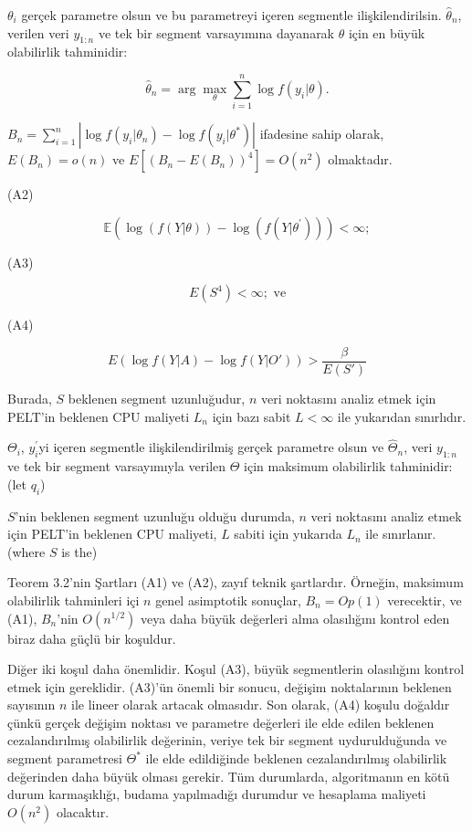 \documentclass[12pt,twoside]{deuthesis}
\begin{document}
\(\theta_i\) gerçek parametre olsun ve bu parametreyi içeren segmentle ilişkilendirilsin. \(\hat{\theta}_n\), verilen veri \(y_{1:n}\) ve tek bir segment varsayımına dayanarak \(\theta\) için en büyük olabilirlik tahminidir:

\[ \hat{\theta}_n = \arg\max_{\theta} \sum_{i=1}^n \log f(y_i|\theta). \]

\(B_n = \sum_{i=1}^n \left| \log f(y_i|\theta_n) - \log f(y_i|\theta^*) \right|\) ifadesine sahip olarak, \(E(B_n) = o(n)\) ve \(E[(B_n - E(B_n))^4] = O(n^2)\) olmaktadır.

(A2)

\[ \mathbb{E} \left( \log(f(Y|\theta)) - \log(f(Y|\theta^{'})) \right) < \infty; \]

(A3)

\[ E(S^4) < \infty; \text{ ve} \]

(A4)

\[ E\left(\log f(Y|A) - \log f(Y|O')\right) > \frac{\beta}{E(S')} \]

Burada, \(S\) beklenen segment uzunluğudur, \(n\) veri noktasını analiz etmek için PELT'in beklenen CPU maliyeti \(L_n\) için bazı sabit \(L < \infty\) ile yukarıdan sınırlıdır.

\(\Theta_i\), \(y_i^{'}\)yi içeren segmentle ilişkilendirilmiş gerçek parametre olsun ve \(\hat{\Theta}_n\), veri \(y_{1:n}\) ve tek bir segment varsayımıyla verilen \(\Theta\) için maksimum olabilirlik tahminidir: (let \(q_i\))

\(S\)'nin beklenen segment uzunluğu olduğu durumda, \(n\) veri noktasını analiz etmek için PELT'in beklenen CPU maliyeti, \(L\) sabiti için yukarıda \(L_n\) ile sınırlanır. (where \(S\) is the)

Teorem 3.2'nin Şartları (A1) ve (A2), zayıf teknik şartlardır. Örneğin, maksimum olabilirlik tahminleri içi \(n\) genel asimptotik sonuçlar, \(B_n = Op(1)\) verecektir, ve (A1), \(B_n\)'nin \(O(n^{1/2})\) veya daha büyük değerleri alma olasılığını kontrol eden biraz daha güçlü bir koşuldur.

Diğer iki koşul daha önemlidir. Koşul (A3), büyük segmentlerin olasılığını kontrol etmek için gereklidir. (A3)'ün önemli bir sonucu, değişim noktalarının beklenen sayısının \(n\) ile lineer olarak artacak olmasıdır. Son olarak, (A4) koşulu doğaldır çünkü gerçek değişim noktası ve parametre değerleri ile elde edilen beklenen cezalandırılmış olabilirlik değerinin, veriye tek bir segment uydurulduğunda ve segment parametresi \(\Theta^*\) ile elde edildiğinde beklenen cezalandırılmış olabilirlik değerinden daha büyük olması gerekir. Tüm durumlarda, algoritmanın en kötü durum karmaşıklığı, budama yapılmadığı durumdur ve hesaplama maliyeti \(O(n^2)\) olacaktır.
\end{document}
